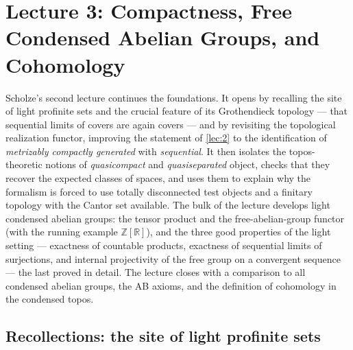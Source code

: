 \section{Lecture 3: Compactness, Free Condensed Abelian Groups, and Cohomology}
\label{lec:3}

Scholze's second lecture continues the foundations. It opens by recalling the
site of light profinite sets and the crucial feature of its Grothendieck
topology --- that sequential limits of covers are again covers --- and by
revisiting the topological realization functor, improving the statement of
\cref{lec:2} to the identification of \emph{metrizably compactly generated} with
\emph{sequential}. It then isolates the topos-theoretic notions of
\emph{quasicompact} and \emph{quasiseparated} object, checks that they recover
the expected classes of spaces, and uses them to explain why the formalism is
forced to use totally disconnected test objects and a finitary topology with the
Cantor set available. The bulk of the lecture develops light condensed abelian
groups: the tensor product and the free-abelian-group functor (with the running
example $\mathbb{Z}[\mathbb{R}]$), and the three good properties of the light
setting --- exactness of countable products, exactness of sequential limits of
surjections, and internal projectivity of the free group on a convergent
sequence --- the last proved in detail. The lecture closes with a comparison to
all condensed abelian groups, the AB axioms, and the definition of cohomology in
the condensed topos.

\subsection{Recollections: the site of light profinite sets}

